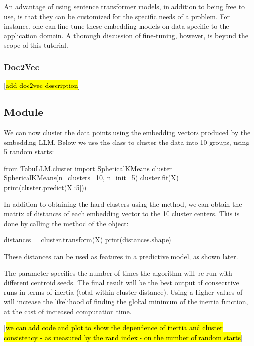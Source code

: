 \documentclass[article]{jss}
\begin{document}
An advantage of using sentence transformer models, in addition to being free to use, is that they can be customized for the specific needs of a problem. For instance, one can fine-tune these embedding models on data specific to the application domain. A thorough discussion of fine-tuning, however, is beyond the scope of this tutorial.

\subsubsection{Doc2Vec}\label{subsubsec:using-embed-doc2vec}

[\hl{add doc2vec description}]

\subsection[cluster Module]{ Module}\label{subsec:using-cluster}

We can now cluster the data points using the embedding vectors produced by the embedding LLM. Below we use the  class to cluster the data into 10 groups, using 5 random starts:
\begin{pyblock}
from TabuLLM.cluster import SphericalKMeans
cluster = SphericalKMeans(n_clusters=10, n_init=5)
cluster.fit(X)
print(cluster.predict(X[:5]))
\end{pyblock}
\stdoutpythontex %

In addition to obtaining the hard clusters using the  method, we can obtain the matrix of distances of each embedding vector to the 10 cluster centers. This is done by calling the  method of the  object:
\begin{pyblock}
distances = cluster.transform(X)
print(distances.shape)
\end{pyblock}
\stdoutpythontex %

These distances can be used as features in a predictive model, as shown later.

The parameter  specifies the number of times the algorithm will be run with different centroid seeds. The final result will be the best output of  consecutive runs in terms of inertia (total within-cluster distance). Using a higher values of  will increase the likelihood of finding the global minimum of the inertia function, at the cost of increased computation time.

[\hl{we can add code and plot to show the dependence of inertia and cluster consistency - as measured by the rand index - on the number of random starts}]
\end{document}
